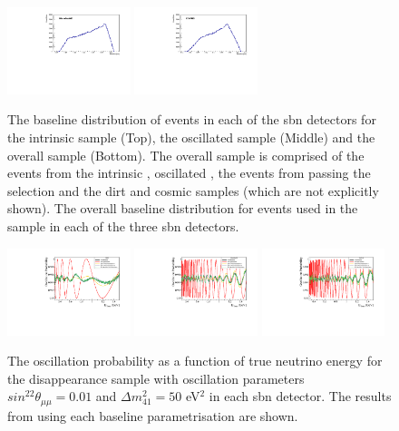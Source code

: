 \begin{figure}[!h]
    \includegraphics[width = 0.32\textwidth]{figures-chap5/MicroBooNE_nue.pdf}
    \includegraphics[width = 0.32\textwidth]{figures-chap5/ICARUS_nue.pdf}
    \caption{The baseline distribution of events in each of the \gls{sbn} detectors for the intrinsic \nue sample (Top), the oscillated \nue sample (Middle) and the overall \nue sample (Bottom). The overall sample is comprised of the events from the intrinsic \nue, oscillated \nue, the \numu events from  passing the \nue selection and the dirt and cosmic samples (which are not explicitly shown).
    The overall baseline distribution for events used in the \nue sample in each of the three \gls{sbn} detectors.}
    \label{fig:nue_baseline_dist}
\end{figure}

\begin{figure}[!h]
    \centering
    \includegraphics[width = 0.32\textwidth]{figures-chap5/osc_prob_sbnd.pdf}
    \includegraphics[width = 0.32\textwidth]{figures-chap5/osc_prob_uboone.pdf}
    \includegraphics[width = 0.32\textwidth]{figures-chap5/osc_prob_icarus.pdf}
    \caption{The oscillation probability as a function of true neutrino energy for the \numu disappearance sample with oscillation parameters $sin^22\theta_{\mu\mu} = 0.01$ and $\Delta m^2_{41} = 50$ eV$^2$ in each \gls{sbn} detector. The results from using each baseline parametrisation are shown.}
    \label{fig:baseline_osc_probability}
\end{figure}

